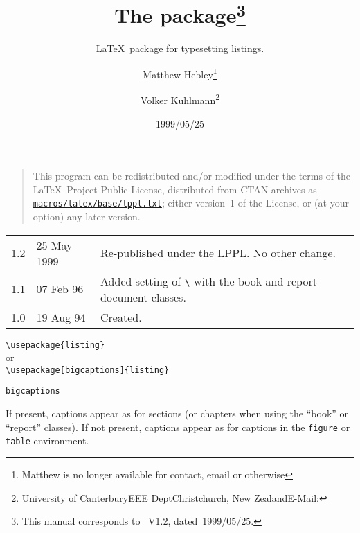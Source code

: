\documentclass[DIV=9, parskip=half, pagesize=auto]{scrartcl}
\title{The \pkg{listing} package\thanks{This manual corresponds to \pkg{listing}~V1.2, dated~1999/05/25.}}
\subtitle{\LaTeX\ package for typesetting listings.}
\author{%
  Matthew Hebley\thanks{Matthew is no longer available for contact, email or otherwise}%
  \and Volker Kuhlmann\thanks{University of Canterbury\newline EEE Dept\newline Christchurch, New Zealand\newline E-Mail: \mail{v.kuhlmann@elec.canterbury.ac.nz}}%
}
\date{1999/05/25}
\makeatletter
\newcommand*{\cls}[1]{\textsf{#1}}
\newcommand*{\cs}[1]{\texttt{\textbackslash#1}}
\newcommand*{\cmd}[1]{\cs{\expandafter\@gobble\string#1}}
\newcommand*{\env}[1]{\texttt{#1}}
\newcommand*{\opt}[1]{\texttt{#1}}
\makeatother
\begin{document}
\maketitle

\begin{quote}
  \footnotesize
  This program can be redistributed and/or modified under the terms
  of the \LaTeX\ Project Public License, distributed from CTAN
  archives as \href{http://www.ctan.org/pub/tex-archive/macros/latex/base/lppl.txt}{\texttt{macros/latex/base/lppl.txt}}; either
  version~1 of the License, or (at your option) any later version.
\end{quote}



\begin{tabular}{@{}ll>{\raggedright\arraybackslash}p{10cm}@{}}
  1.2 & 25 May 1999 & Re-published under the LPPL\@. No other change.                                           \\
  1.1 & 07 Feb 96   & Added setting of \cmd{\thelisting} with the \cls{book} and \cls{report} document classes. \\
  1.0 & 19 Aug 94   & Created.
\end{tabular}



\verb+\usepackage{listing}+\\
or\\
\verb+\usepackage[bigcaptions]{listing}+



\begin{labeling}{\opt{bigcaptions}}
\item[\opt{bigcaptions}] If present, captions appear as for sections
  (or chapters when using the ``\cls{book}'' or ``\cls{report}'' 
  classes).
  If not present, captions appear as for captions
  in the \env{figure} or \env{table} environment.
\end{labeling}



\end{document}

